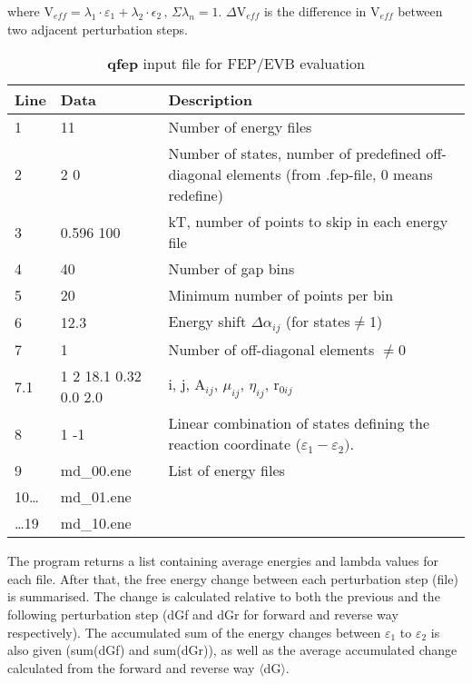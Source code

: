 \documentclass[a4paper,10pt]{article}
\begin{document}
where V$_{eff}= \lambda_1 \cdot \varepsilon_1 + \lambda_2 \cdot
\epsilon_2 \, , \, \Sigma \lambda_n = 1$. $\Delta $V$_{eff}$ is
the difference in V$_{eff}$ between two adjacent perturbation
steps.

\begin{table}
\caption{\textbf{qfep} input file for FEP/EVB evaluation}
\begin{tabularx}{\textwidth}{|l|l|X|}
\hline \textbf{Line}& \textbf{Data}& \textbf{Description} \\
\hline 1  & 11            & Number of energy files \\
\hline 2  & 2 0           & Number of states, number of predefined off-diagonal elements (from .fep-file, 0 means redefine) \\
\hline 3  & 0.596 100     & kT, number of points to skip in each energy file \\
\hline 4  & 40            & Number of gap bins \\
\hline 5  & 20            & Minimum number of points per bin \\
\hline 6  & 12.3          & Energy shift $\Delta \alpha_{ij}$ (for states$\ne $1) \\
\hline 7  & 1             & Number of off-diagonal elements $\ne $0 \\
\hline 7.1& 1 2 18.1 0.32 0.0 2.0 & i, j, A$_{ij}$, $\mu _{ij}$, $\eta _{ij}$, r$_{0ij}$ \\
\hline 8  & 1 -1          & Linear combination of states defining the reaction coordinate ($\varepsilon_{1}-\varepsilon_{2})$. \\
\hline 9  & md{\_}00.ene  & List of energy files \\
\hline 10{\ldots}& md{\_}01.ene& \\
\hline {\ldots}19& md{\_}10.ene& \\
\hline
\end{tabularx}
\end{table}

The program returns a list containing average energies and lambda
values for each file. After that, the free energy change between
each perturbation step (file) is summarised. The change is
calculated relative to both the previous and the following
perturbation step (dGf and dGr for forward and reverse way
respectively). The accumulated sum of the energy changes between
$\varepsilon_{1}$ to $\varepsilon_{2}$ is also given (sum(dGf) and
sum(dGr)), as well as the average accumulated change calculated
from the forward and reverse way $\langle$dG$\rangle$.
\end{document}
